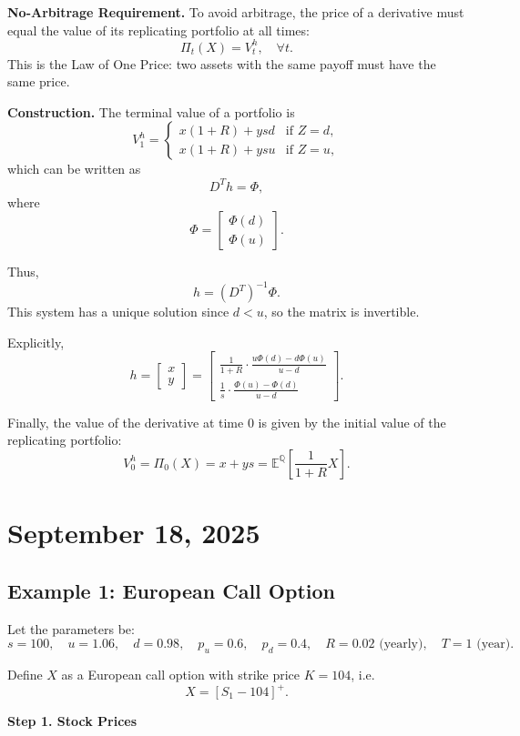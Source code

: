 \documentclass[12pt,a4paper]{article}
\theoremstyle{definition}
\newcommand{\Q}{\mathbb{Q}}
\newcommand{\E}{\mathbb{E}}
\begin{document}
\textbf{No-Arbitrage Requirement.}
To avoid arbitrage, the price of a derivative must equal the value of its replicating portfolio at all times:
\[
\Pi_t(X) = V_t^h, \quad \forall t.
\]
This is the Law of One Price: two assets with the same payoff must have the same price.

\textbf{Construction.}
The terminal value of a portfolio is
\[
V_1^h = \begin{cases}
x(1 + R) + ysd & \text{if } Z = d, \\
x(1 + R) + ysu & \text{if } Z = u,
\end{cases}
\]
which can be written as
\[
D^T h = \Phi,
\]
where
\[
\Phi = \begin{bmatrix}
\Phi(d) \\
\Phi(u)
\end{bmatrix}.
\]

Thus,
\[
h = (D^T)^{-1}\Phi.
\]
This system has a unique solution since $d < u$, so the matrix is invertible.

Explicitly,
\[
h = \begin{bmatrix}
x \\
y
\end{bmatrix} = \begin{bmatrix}
\frac{1}{1+R} \cdot \frac{u\Phi(d) - d\Phi(u)}{u - d} \\
\frac{1}{s} \cdot \frac{\Phi(u) - \Phi(d)}{u - d}
\end{bmatrix}.
\]

Finally, the value of the derivative at time 0 is given by the initial value of the replicating portfolio:
\[
V_0^h = \Pi_0(X) = x + ys = \E^\Q\left[\frac{1}{1+R}X\right].
\]

\newpage
\section{September 18, 2025}

\subsection{Example 1: European Call Option}

Let the parameters be:
\[
s = 100, \quad u = 1.06, \quad d = 0.98, \quad p_u = 0.6, \quad p_d = 0.4, \quad R = 0.02 \text{ (yearly)}, \quad T = 1 \text{ (year)}.
\]

Define $X$ as a European call option with strike price $K = 104$, i.e.
\[
X = [S_1 - 104]^+.
\]

\textbf{Step 1. Stock Prices}
\end{document}
